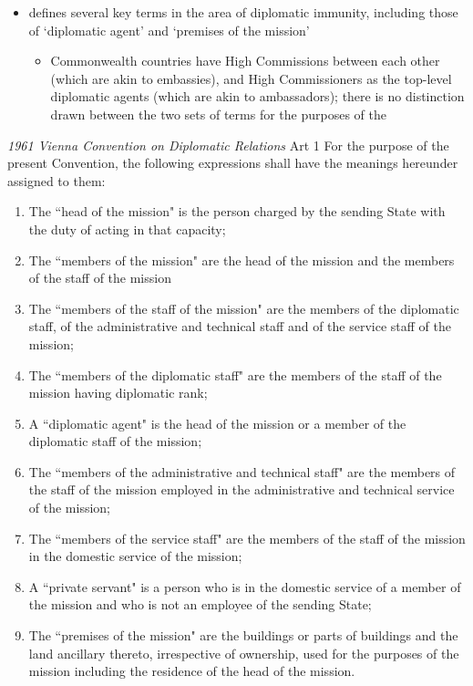 \begin{itemize}
\begin{itemize}
    \end{itemize}
    \item {} defines several key terms in the area of diplomatic immunity, including those of `diplomatic agent' and `premises of the mission'
    \begin{itemize}
        \item Commonwealth countries have High Commissions between each other (which are akin to embassies), and High Commissioners as the top-level diplomatic agents (which are akin to ambassadors); there is no distinction drawn between the two sets of terms for the purposes of the 
    \end{itemize}
\end{itemize}

\begin{conventiondetails}{\textit{1961 Vienna Convention on Diplomatic Relations} Art 1}
    \flushleft
    For the purpose of the present Convention, the following expressions shall have the meanings hereunder assigned to them:
    \begin{enumerate}[label=(\alph*)]
        \item The ``head of the mission" is the person charged by the sending State with the duty of acting in that capacity;
        \item The ``members of the mission" are the head of the mission and the members of the staff of the mission
        \item The ``members of the staff of the mission" are the members of the diplomatic staff, of the administrative and technical staff and of the service staff of the mission;
        \item The ``members of the diplomatic staff" are the members of the staff of the mission having diplomatic rank;
        \item A ``diplomatic agent" is the head of the mission or a member of the diplomatic staff of the mission;
        \item The ``members of the administrative and technical staff" are the members of the staff of the mission employed in the administrative and technical service of the mission;
        \item The ``members of the service staff" are the members of the staff of the mission in the domestic service of the mission;
        \item A ``private servant" is a person who is in the domestic service of a member of the mission and who is not an employee of the sending State;
        \item The ``premises of the mission" are the buildings or parts of buildings and the land ancillary thereto, irrespective of ownership, used for the purposes of the mission including the residence of the head of the mission.
    \end{enumerate}
\end{conventiondetails}

